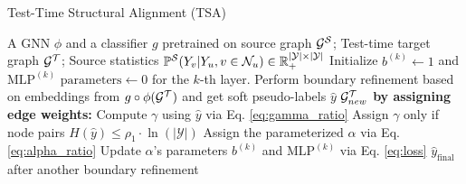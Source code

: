 



\begin{algorithm}[t]
   \caption{Test-Time Structural Alignment (TSA)}
   \label{alg:example}
\begin{algorithmic}[1]
    A GNN $\phi$ and a classifier $g$ pretrained on source graph ${\mathcal{G}}^{{\mathcal{S}}}$; Test-time target graph ${\mathcal{G}}^{{\mathcal{T}}}$; Source statistics $\mathbb{P}^\mathcal{S}(Y_v|Y_u,v\in \mathcal{N}_u)\in \mathbb{R}_+^{|{\mathcal{Y}}|\times|{\mathcal{Y}}|}$
   \STATE Initialize $b^{(k)}\leftarrow 1$ and $\text{MLP}^{(k)}\text{ parameters} \leftarrow0$ for the $k$-th layer.
    \STATE Perform boundary refinement based on embeddings from $g\circ \phi({\mathcal{G}}^{{\mathcal{T}}})$ and get soft pseudo-labels $\hat{y}$
     ${\mathcal{G}}^{{\mathcal{T}}}_{new}$ {\bfseries by assigning edge weights:}
    \INDSTATE Compute $\gamma$ using  $\hat{y}$ via Eq. \ref{eq:gamma_ratio}
    \INDSTATE  Assign $\gamma$ only if node pairs $H(\hat{y})\leq \rho_1 \cdot \ln(|\mathcal{Y}|)$
        \INDSTATE Assign the parameterized $\alpha$ via Eq. \ref{eq:alpha_ratio}
    \STATE Update $\alpha$'s parameters $b^{(k)}$ and $\text{MLP}^{(k)}$ via Eq. \ref{eq:loss}
    $\hat{y}_{\mathrm{final}}$ after another boundary refinement
\end{algorithmic}
\end{algorithm}



